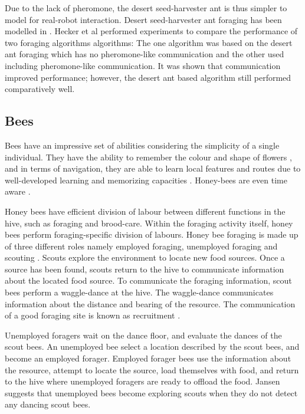 Due to the lack of pheromone, the desert seed-harvester ant is thus simpler to model for real-robot interaction. Desert seed-harvester ant foraging has been modelled in \cite{moller1998modeling,hecker2012formica}. Hecker et al \cite{hecker2012formica} performed experiments to compare the performance of two foraging algorithms algorithms: The one algorithm was based on the desert ant foraging which has no pheromone-like communication and the other used including pheromone-like communication. It was shown that communication improved performance; however, the desert ant based algorithm still performed comparatively well. 

\subsection{Bees}
\label{bees:biologicalinspiration}
Bees have an impressive set of abilities considering the simplicity of a single individual. They have the ability to remember the colour and shape of flowers \cite{zhang2006honeybee}, and in terms of navigation, they are able to learn local features and routes due to well-developed learning and memorizing capacities \cite{menzel2001cognitive}. Honey-bees are even time aware \cite{moore1989influence}. 

Honey bees have efficient division of labour between different functions in the hive, such as foraging and brood-care. Within the foraging activity itself, honey bees perform foraging-specific division of labours. Honey bee foraging is made up of three different roles namely employed foraging, unemployed foraging and scouting \cite{seeley2009wisdom}. Scouts explore the environment to locate new food sources. Once a source has been found, scouts return to the hive to communicate information about the located food source. To communicate the foraging information, scout bees perform a waggle-dance at the hive. The waggle-dance communicates information about the distance and bearing of the resource. The communication of a good foraging site is known as recruitment \cite{seeley2009wisdom}.

Unemployed foragers wait on the dance floor, and evaluate the dances of the scout bees. An unemployed bee select a location described by the scout bees, and become an employed forager. Employed forager bees use the information about the resource, attempt to locate the source, load themselves with food, and return to the hive where unemployed foragers are ready to offload the food. Jansen \cite{janson2007searching} suggests that unemployed bees become exploring scouts when they do not detect any dancing scout bees. 

